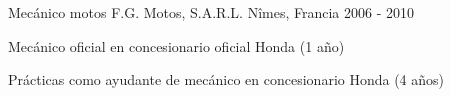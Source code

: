 \begin{cventries}
  \cventry
    {Mecánico motos} %
    {F.G. Motos, S.A.R.L.} %
    {Nîmes, Francia} %
    {2006 - 2010} %
    {
      \begin{cvitems} %
        \item {Mecánico oficial en concesionario oficial Honda (1 año)}
        \item {Prácticas como ayudante de mecánico en concesionario Honda (4 años)}
      \end{cvitems}
    }

\end{cventries}
